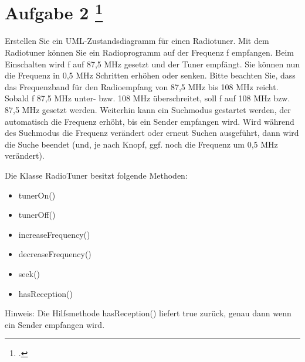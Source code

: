 \documentclass{lehramt-informatik-aufgabe}
\begin{document}
\section{Aufgabe 2
\footcite{66116:2015:03}}

Erstellen Sie ein UML-Zustandsdiagramm für einen Radiotuner. Mit dem
Radiotuner können Sie ein Radioprogramm auf der Frequenz f empfangen.
Beim Einschalten wird f auf 87,5 MHz gesetzt und der Tuner empfängt. Sie
können nun die Frequenz in 0,5 MHz Schritten erhöhen oder senken. Bitte
beachten Sie, dass das Frequenzband für den Radioempfang von 87,5
MHz bis 108 MHz reicht. Sobald f 87,5 MHz unter- bzw. 108 MHz
überschreitet, soll f auf 108 MHz bzw. 87,5 MHz gesetzt werden. Weiterhin
kann ein Suchmodus gestartet werden, der automatisch die Frequenz
erhöht, bis ein Sender empfangen wird. Wird während des Suchmodus die
Frequenz verändert oder erneut Suchen ausgeführt, dann wird die Suche
beendet (und, je nach Knopf, ggf. noch die Frequenz um 0,5 MHz
verändert).

\noindent
Die Klasse RadioTuner besitzt folgende Methoden:

\begin{itemize}
\item tunerOn()
\item tunerOff()
\item increaseFrequency()
\item decreaseFrequency()
\item seek()
\item hasReception()
\end{itemize}

\noindent
Hinweis: Die Hilfsmethode hasReception() liefert true zurück, genau dann
wenn ein Sender empfangen wird.

\end{document}
